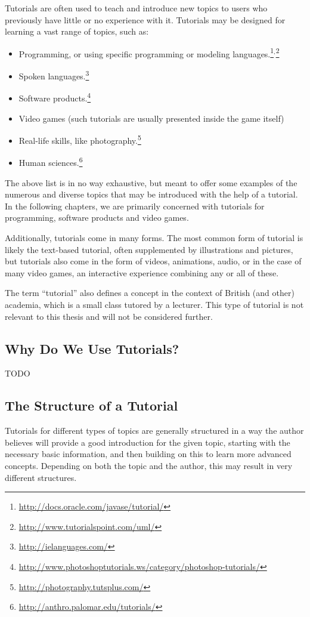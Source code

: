 \noindent
Tutorials are often used to teach and introduce new topics to users who previously have little or no experience with it. Tutorials may be designed for learning a vast range of topics, such as:
\begin{itemize}
	\item Programming, or using specific programming or modeling languages.\footnote{\url{http://docs.oracle.com/javase/tutorial/}}$^{,}$\footnote{\url{http://www.tutorialspoint.com/uml/}}
	\item Spoken languages.\footnote{\url{http://ielanguages.com/}}
	\item Software products.\footnote{\url{http://www.photoshoptutorials.ws/category/photoshop-tutorials/}}
	\item Video games (such tutorials are usually presented inside the game itself)
	\item Real-life skills, like photography.\footnote{\url{http://photography.tutsplus.com/}}
	\item Human sciences.\footnote{\url{http://anthro.palomar.edu/tutorials/}}
\end{itemize}

\noindent
The above list is in no way exhaustive, but meant to offer some examples of the numerous and diverse topics that may be introduced with the help of a tutorial. In the following chapters, we are primarily concerned with tutorials for programming, software products and video games.

\noindent
Additionally, tutorials come in many forms. The most common form of tutorial is likely the text-based tutorial, often supplemented by illustrations and pictures, but tutorials also come in the form of videos, animations, audio, or in the case of many video games, an interactive experience combining any or all of these.

\noindent
The term ``tutorial'' also defines a concept in the context of British (and other) academia, which is a small class tutored by a lecturer. This type of tutorial is not relevant to this thesis and will not be considered further.

\subsection{Why Do We Use Tutorials?}
\label{sec:tutorial_why}
TODO

\subsection{The Structure of a Tutorial}
\label{sec:tutorial_structure}
Tutorials for different types of topics are generally structured in a way the author believes will provide a good introduction for the given topic, starting with the necessary basic information, and then building on this to learn more advanced concepts. Depending on both the topic and the author, this may result in very different structures.


